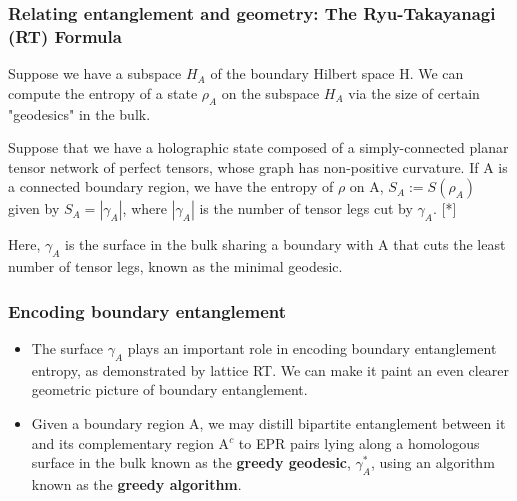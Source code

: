 \documentclass[11pt]{beamer}
\newcommand{\vs}{\vskip10pt}
\begin{document}
\begin{frame}
	
	\frametitle{Relating entanglement and geometry: The Ryu-Takayanagi (RT) Formula}
	
	Suppose we have a subspace $H_A$ of the boundary Hilbert space H. We can compute the entropy of a state $ \rho_A $ on the subspace $ H_A $ via the size of certain "geodesics" in the bulk. 
	
	\begin{theorem}
		
		Suppose that we have a holographic state composed of a simply-connected planar tensor network of perfect tensors, whose graph has non-positive curvature. If A is a connected boundary region, we have the entropy of $\rho$ on A, $ S_A := S(\rho_A)$  given by $S_A = | \gamma_A | $, where $ | \gamma_A | $ is the number of tensor legs cut by $ \gamma_A $.  [*]
		
	\end{theorem}
	\vs
	Here, $\gamma_A$ is the surface in the bulk sharing a boundary with A that cuts the least number of tensor legs, known as the minimal geodesic.
	
\end{frame}

\begin{frame}
	
	\frametitle{Encoding boundary entanglement}
	
	\begin{itemize}
		
		
		\item The surface $ \gamma_A $ plays an important role in encoding boundary entanglement entropy, as demonstrated by lattice RT. We can make it paint an even clearer geometric picture of boundary entanglement. 
		\vs
		\item Given a boundary region A, we may distill bipartite entanglement between it and its complementary region A$^c$ to EPR pairs lying along a homologous surface in the bulk known as the \textbf{greedy geodesic}, $\gamma_A^*$, using an algorithm known as the \textbf{greedy algorithm}.
		
		
	\end{itemize}
	
\end{frame}
\end{document}
